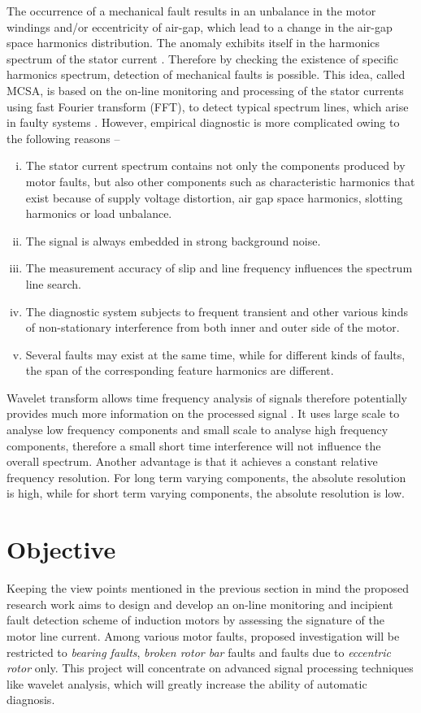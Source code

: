 \documentclass[a4paper,11pt]{article}
\begin{document}
The occurrence of a mechanical fault results in an unbalance in the motor windings and/or eccentricity of air-gap, which lead to a change in the air-gap space harmonics distribution. The anomaly exhibits itself in the harmonics spectrum of the stator current \cite{00897122-1}. Therefore by checking the existence of specific harmonics spectrum, detection of mechanical faults is possible. This idea, called MCSA, is based on the on-line monitoring and processing of the stator currents using fast Fourier transform (FFT), to detect typical spectrum lines, which arise in faulty systems \cite{00897122-6}. However, empirical diagnostic is more complicated owing to the following reasons --

\begin{enumerate}[(i)]
\item The stator current spectrum contains not only the components produced by motor faults, but also other components such as characteristic harmonics that exist because of supply voltage distortion, air gap space harmonics, slotting harmonics or load unbalance. 
\item The signal is always embedded in strong background noise. 
\item The measurement accuracy of slip and line frequency influences the spectrum line search. 
\item The diagnostic system subjects to frequent transient and other various kinds of non-stationary interference from both inner and outer side of the motor. 
\item Several faults may exist at the same time, while for different kinds of faults, the span of the corresponding feature harmonics are different.
\end{enumerate}

Wavelet transform allows time frequency analysis of signals therefore potentially provides much more information on the processed signal \cite{pswbook}. It uses large scale to analyse low frequency components and small scale to analyse high frequency components, therefore a small short time interference will not influence the overall spectrum. Another advantage is that it achieves a constant relative frequency resolution. For long term varying components, the absolute resolution is high, while for short term varying components, the absolute resolution is low.

\section{Objective} \label{obj}
Keeping the view points mentioned in the previous section in mind the proposed research work aims to design and develop an on-line monitoring and incipient fault detection scheme of induction motors by assessing the signature of the motor line current. Among various motor faults, proposed investigation will be restricted to \emph{bearing faults}, \emph{broken rotor bar} faults and faults due to \emph{eccentric rotor} only. This project will concentrate on advanced signal processing techniques like wavelet analysis, which will greatly increase the ability of automatic diagnosis.
\end{document}
